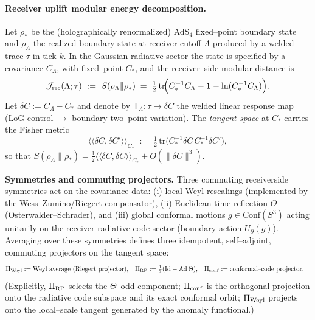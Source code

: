 \documentclass[10pt]{article}
\theoremstyle{definition}
\theoremstyle{plain}
\begin{document}
\paragraph{Receiver uplift modular energy decomposition.}
\label{para:uplift-decomp}
Let $\rho_\ast$ be the (holographically renormalized) AdS$_4$ fixed–point boundary state and
$\rho_\Lambda$ the realized boundary state at receiver cutoff $\Lambda$ produced by a welded
trace $\tau$ in tick $k$. In the Gaussian radiative sector the state is specified by a covariance
$C_\Lambda$, with fixed–point $C_\ast$, and the receiver–side modular distance is
\begin{equation}
\label{eq:master-receiver}
\mathcal J_{\rm rec}(\Lambda;\tau)\ :=\ S(\rho_\Lambda\|\rho_\ast)
\;=\;\tfrac12\,\mathrm{tr}\!\Big(C_\ast^{-1}C_\Lambda-\mathbf 1-\ln(C_\ast^{-1}C_\Lambda)\Big).
\end{equation}
Let $\delta C:=C_\Lambda-C_\ast$ and denote by $\mathsf T_\Lambda:\tau\mapsto\delta C$ the welded
linear response map (LoG control $\to$ boundary two–point variation). The \emph{tangent space} at
$C_\ast$ carries the Fisher metric
\begin{equation}
\label{eq:fisher}
\big\langle\!\big\langle \delta C,\delta C'\big\rangle\!\big\rangle_{C_\ast}
\;:=\;\tfrac12\,\mathrm{tr}\!\big(C_\ast^{-1}\delta C\,C_\ast^{-1}\delta C'\big),
\end{equation}
so that
$S(\rho_\Lambda\|\rho_\ast)=\tfrac12\langle\!\langle \delta C,\delta C\rangle\!\rangle_{C_\ast}+O(\|\delta C\|^3)$.

\medskip
\noindent\textbf{Symmetries and commuting projectors.}
Three commuting receiverside symmetries act on the covariance data:
(i) local Weyl rescalings (implemented by the Wess–Zumino/Riegert compensator),
(ii) Euclidean time reflection $\Theta$ (Osterwalder–Schrader), and
(iii) global conformal motions $g\in\mathrm{Conf}(S^3)$ acting unitarily on the receiver radiative code sector (boundary action $U_\partial(g)$). Averaging over these symmetries defines three
idempotent, self–adjoint, commuting projectors on the tangent space:
\begin{align}
\label{eq:projectors}
\Pi_{\rm Weyl}&:=\text{Weyl average (Riegert projector)},&
\Pi_{\rm RP}&:=\tfrac12(\mathrm{Id}-\mathrm{Ad}\,\Theta),&
\Pi_{\rm conf}&:=\text{conformal–code projector}.
\end{align}
(Explicitly, $\Pi_{\rm RP}$ selects the $\Theta$–odd component; $\Pi_{\rm conf}$ is the orthogonal
projection onto the radiative code subspace and its exact conformal orbit; $\Pi_{\rm Weyl}$ projects
onto the local–scale tangent generated by the anomaly functional.)
\end{document}
